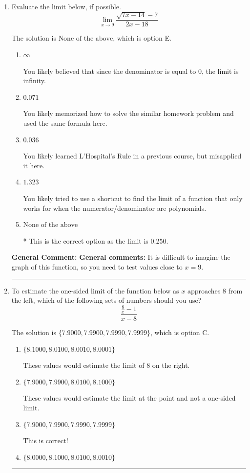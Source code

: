\documentclass{extbook}[14pt]
\newcommand{\litem}[1]{\item #1

\rule{\textwidth}{0.4pt}}
\begin{document}
\begin{enumerate}\litem{
Evaluate the limit below, if possible.
\[ \lim_{x \rightarrow 9} \frac{\sqrt{7x - 14} - 7}{2x - 18} \]

The solution is \( \text{None of the above} \), which is option E.\begin{enumerate}[label=\Alph*.]
\item \( \infty \)

You likely believed that since the denominator is equal to 0, the limit is infinity.
\item \( 0.071 \)

You likely memorized how to solve the similar homework problem and used the same formula here.
\item \( 0.036 \)

You likely learned L'Hospital's Rule in a previous course, but misapplied it here.
\item \( 1.323 \)

You likely tried to use a shortcut to find the limit of a function that only works for when the numerator/denominator are polynomials.
\item \( \text{None of the above} \)

* This is the correct option as the limit is 0.250.
\end{enumerate}

\textbf{General Comment:} \textbf{General comments:} It is difficult to imagine the graph of this function, so you need to test values close to $x = 9$.
}
\litem{
To estimate the one-sided limit of the function below as $x$ approaches 8 from the left, which of the following sets of numbers should you use?
\[ \frac{\frac{8}{x} - 1}{x - 8} \]

The solution is \( \{ 7.9000, 7.9900, 7.9990, 7.9999 \} \), which is option C.\begin{enumerate}[label=\Alph*.]
\item \( \{ 8.1000, 8.0100, 8.0010, 8.0001 \} \)

These values would estimate the limit of 8 on the right.
\item \( \{ 7.9000, 7.9900, 8.0100, 8.1000 \} \)

These values would estimate the limit at the point and not a one-sided limit.
\item \( \{ 7.9000, 7.9900, 7.9990, 7.9999 \} \)

This is correct!
\item \( \{ 8.0000, 8.1000, 8.0100, 8.0010 \} \)


\end{enumerate}}
\end{enumerate}
\end{document}
